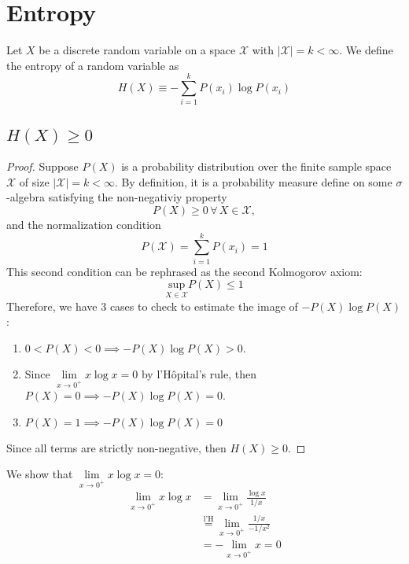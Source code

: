 \documentclass{article}
\numberwithin{equation}{section}
\theoremstyle{casep}
\begin{document}
\section{Entropy}
Let $X$ be a discrete random variable on a space $\mathcal{X}$ with 
$|\mathcal{X}| = k < \infty $.
We define the entropy of a random variable as 
\begin{equation}\label{eq:Entropy}
        H(X) \equiv - \sum_{i = 1}^k P(x_i) \log P(x_i)
\end{equation} 

\subsection{$H(X) \geq 0$}
\begin{proof}
        Suppose $P(X)$ is a probability distribution over the finite sample space 
        $\mathcal{X}$ of size $|\mathcal{X}| = k < \infty $. By definition, it is a 
        probability measure define on some $\sigma$-algebra satisfying the non-negativiy 
        property
        \[
                P(X) \geq 0\, \forall \, X \in \mathcal{X},
        \]
        and the normalization condition
        \[
                P(\mathcal{X}) = \sum_{i = 1}^k P(x_i) = 1
        \]
        This second condition can be rephrased as the second Kolmogorov 
        axiom:
        \[
                \underset{X \in \mathcal{X}}{\text{sup}} P(X) \leq 1
        \]
        Therefore, we have 3 cases to check to estimate the image of $-P(X)\log P(X)$:
        \begin{enumerate}
                \item $0 < P(X) < 0 \implies -P(X) \log P(X) > 0$.
                \item Since $\lim\limits_{x \rightarrow 0^+ } x \log x = 0$ 
                        by l'H\^opital's rule, then 
                        $P(X) = 0  \implies -P(X) \log P(X) = 0$.
                \item $P(X) = 1 \implies -P(X) \log P(X) = 0$
        \end{enumerate}
        Since all terms are strictly non-negative, then $H(X) \geq 0$.
\end{proof}
We show that $\lim\limits_{x \rightarrow 0^+} x \log x = 0$:
\begin{align*}
        \lim\limits_{x \rightarrow 0^+} x \log x &=  
        \lim\limits_{x \rightarrow 0^+} \frac{\log x}{1/x} \\
        &\overset{\text{l'H}}{=} \lim\limits_{x \rightarrow 0^+} \frac{1/x}{-1/x^2} \\
        &= -\lim\limits_{x \rightarrow 0^+} x = 0
\end{align*}
\end{document}
